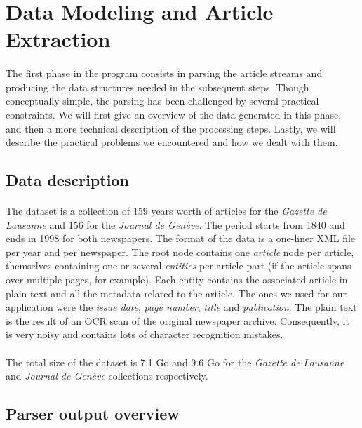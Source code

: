 \section{Data Modeling and Article Extraction}
\paragraph{}
The first phase in the program consists in parsing the article streams and producing the data structures needed in the subsequent steps. Though conceptually simple, the parsing has been challenged by several practical constraints. We will first give an overview of the data generated in this phase, and then a more technical description of the processing steps. Lastly, we will describe the practical problems we encountered and how we dealt with them.

\subsection{Data description}
\paragraph{}
The dataset is a collection of 159 years worth of articles for the \emph{Gazette de Lausanne} and 156 for the \emph{Journal de Genève}. The period starts from 1840 and ends in 1998 for both newspapers. The format of the data is a one-liner XML file per year and per newspaper. The root node contains one \textit{article} node per article, themselves containing one or several \textit{entities} per article part (if the article spans over multiple pages, for example). Each entity contains the associated article in plain text and all the metadata related to the article. The ones we used for our application were the \textit{issue date}, \textit{page number}, \textit{title} and \textit{publication}. The plain text is the result of an OCR scan of the original newspaper archive. Consequently, it is very noisy and contains lots of character recognition mistakes.
\paragraph{}
The total size of the dataset is 7.1 Go and 9.6 Go for the \emph{Gazette de Lausanne} and \emph{Journal de Genève} collections respectively.

\subsection{Parser output overview}
